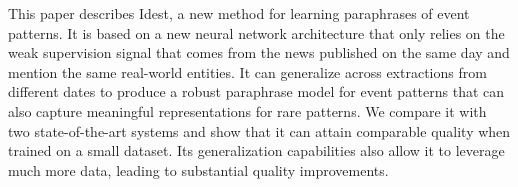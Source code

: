 This paper describes Idest, a new method for learning paraphrases of event patterns. It is based on a new neural network architecture that only relies on the weak supervision signal that comes from the news published on the same day and mention the same real-world entities. It can generalize across extractions from different dates to produce a robust paraphrase model for event patterns that can also capture meaningful representations for rare patterns. We compare it with two state-of-the-art systems and show that it can attain comparable quality when trained on a small dataset. Its generalization capabilities also allow it to leverage much more data, leading to substantial quality improvements.
